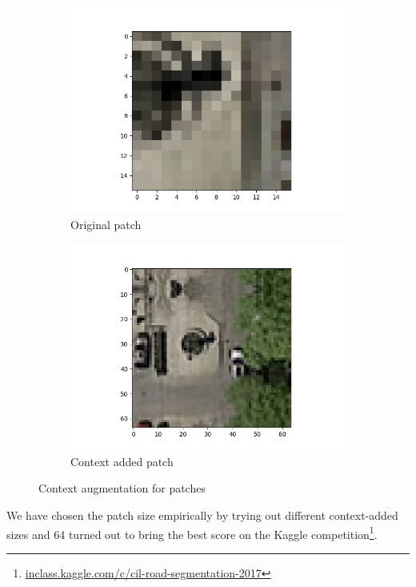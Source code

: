 \documentclass[10pt,conference,compsocconf]{IEEEtran}
\begin{document}
\begin{figure}
\centering
\begin{subfigure}{.5\columnwidth}
  \centering
  \includegraphics[width=.8\linewidth]{orig_patch.png}
  \caption{Original patch}
\end{subfigure}%
\begin{subfigure}{.5\columnwidth}
  \centering
  \includegraphics[width=\linewidth]{cont_added_patch.png}
  \caption{Context added patch}
\end{subfigure}
\caption{Context augmentation for patches}
\label{fig:patches}
\end{figure}

We have chosen the patch size empirically by trying out different context-added sizes and 64 turned out to bring the
best score on the Kaggle competition\footnote{\url{inclass.kaggle.com/c/cil-road-segmentation-2017}}.
\end{document}
